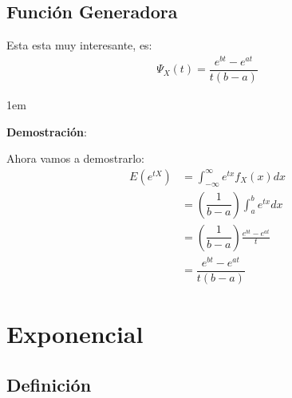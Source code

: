 \documentclass[12pt, fleqn]{report}                             %
\newenvironment{SmallIndentation}[1][0.75em]                    %
        {\begin{adjustwidth}{#1}{}\begin{footnotesize}}             %
        {\end{footnotesize}\end{adjustwidth}}                       %
\theoremstyle{break}                                            %
\newcommand{\Wrap}[1]           {\left( #1 \right)}             %
\newcommand{\pfrac}[2]      {\Wrap{\dfrac{#1}{#2}}}             %
\begin{document}
            \subsection{Función Generadora}

                Esta esta muy interesante, es:
                \begin{align*}
                    \Psi_X(t) = \dfrac{e^{bt} - e^{at}}{t(b -a)}
                \end{align*}

                \begin{SmallIndentation}[1em]
                    \textbf{Demostración}:
                    
                    Ahora vamos a demostrarlo:
                    \begin{align*}
                        E(e^{tX}) 
                            &= \int_{-\infty}^\infty e^{tx} f_X (x) dx              \\
                            &= \pfrac{1}{b-a} \int_a^b e^{tx} dx                    \\
                            &= \pfrac{1}{b-a} \frac{e^{bt} - e^{at}}{t}             \\
                            &= \dfrac{e^{bt} - e^{at}}{t(b -a)}
                    \end{align*}

                \end{SmallIndentation}
                    



        \clearpage
        \section{Exponencial}

            \subsection{Definición}
\end{document}
